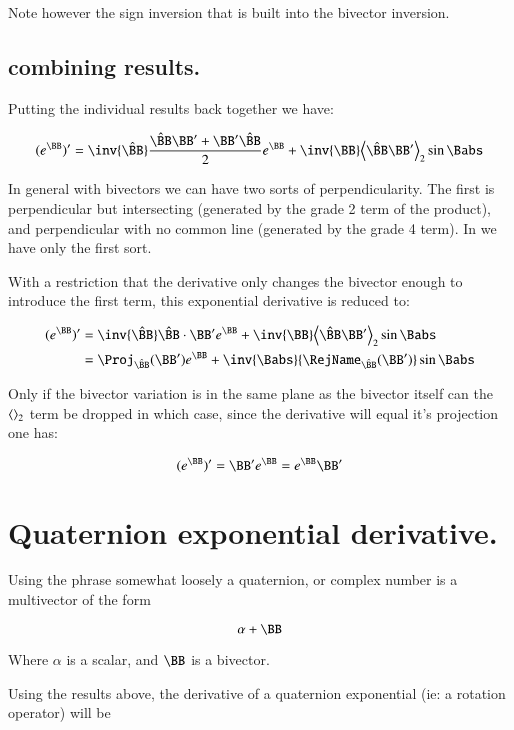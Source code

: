Note however the sign inversion that is built into the bivector inversion.

\subsection{combining results. }

Putting the individual results back together we have:

\begin{equation}
(e^{\BB})'
= \inv{\Bcap}\frac{\Bcap\BB' + \BB'\Bcap}{2} e^{\BB} + \inv{\BB}\gpgradetwo{\Bcap\BB'} \sin\Babs 
\end{equation}

In general with bivectors we can have two sorts of perpendicularity.  The first is perpendicular but intersecting (generated by the grade 2 term of the product), and perpendicular with no common line (generated by the grade 4 term).
In  we have only the first sort.

With a restriction that the derivative only changes the bivector enough to introduce the first term, this
exponential derivative is reduced to:

\begin{align*}
(e^{\BB})'
&= \inv{\Bcap}\Bcap \cdot \BB' e^{\BB} + \inv{\BB}\gpgradetwo{\Bcap\BB'} \sin\Babs \\
&= \Proj_{\Bcap}(\BB') e^{\BB} + \inv{\Babs}{\RejName_{\Bcap}(\BB')} \sin\Babs \\
\end{align*}

Only if the bivector variation is in the same plane as the bivector itself can the ${\left\langle{{}}\right\rangle}_{2}$ term be dropped
in which case, since the derivative will equal it's projection one has:

\begin{equation}
(e^{\BB})' = \BB' e^{\BB} = e^{\BB} \BB' 
\end{equation}

\section{Quaternion exponential derivative. } 

Using the phrase somewhat loosely a quaternion, or complex number is a multivector of the form

\[
\alpha + \BB
\]

Where $\alpha$ is a scalar, and $\BB$ is a bivector.

Using the results above, the derivative of a quaternion exponential (ie: a rotation operator) will be

